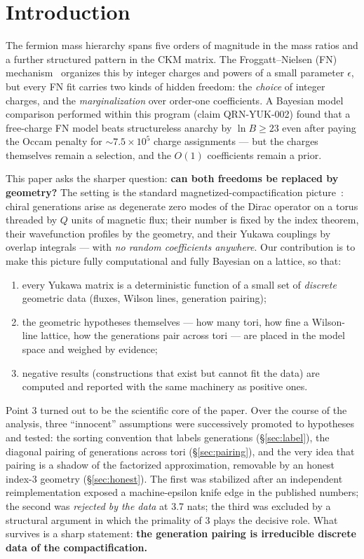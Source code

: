 \documentclass[aps,prd,preprint,nofootinbib]{revtex4-2}
\begin{document}
\section{Introduction}

The fermion mass hierarchy spans five orders of magnitude in the mass ratios
and a further structured pattern in the CKM matrix. The Froggatt--Nielsen (FN)
mechanism~\cite{FN} organizes this by integer charges and powers of a small
parameter $\epsilon$, but every FN fit carries two kinds of hidden freedom: the
\emph{choice} of integer charges, and the \emph{marginalization} over order-one
coefficients. A Bayesian model comparison performed within this program (claim
QRN-YUK-002) found that a free-charge FN model beats structureless anarchy by
$\ln B\ge 23$ even after paying the Occam penalty for $\sim 7.5\times 10^5$
charge assignments --- but the charges themselves remain a selection, and the
$O(1)$ coefficients remain a prior.

This paper asks the sharper question: \textbf{can both freedoms be replaced by
geometry?} The setting is the standard magnetized-compactification
picture~\cite{Bachas,Cremades}: chiral generations arise as degenerate zero
modes of the Dirac operator on a torus threaded by $Q$ units of magnetic flux;
their number is fixed by the index theorem, their wavefunction profiles by the
geometry, and their Yukawa couplings by overlap integrals --- with \emph{no
random coefficients anywhere}. Our contribution is to make this picture fully
computational and fully Bayesian on a lattice, so that:
\begin{enumerate}
\item every Yukawa matrix is a deterministic function of a small set of
      \emph{discrete} geometric data (fluxes, Wilson lines, generation
      pairing);
\item the geometric hypotheses themselves --- how many tori, how fine a
      Wilson-line lattice, how the generations pair across tori --- are placed
      in the model space and weighed by evidence;
\item negative results (constructions that exist but cannot fit the data) are
      computed and reported with the same machinery as positive ones.
\end{enumerate}

Point 3 turned out to be the scientific core of the paper. Over the course of
the analysis, three ``innocent'' assumptions were successively promoted to
hypotheses and tested: the sorting convention that labels generations
(\S\ref{sec:label}), the diagonal pairing of generations across tori
(\S\ref{sec:pairing}), and the very idea that pairing is a shadow of the
factorized approximation, removable by an honest index-3 geometry
(\S\ref{sec:honest}). The first was stabilized after an independent
reimplementation exposed a machine-epsilon knife edge in the published numbers;
the second was \emph{rejected by the data} at 3.7 nats; the third was excluded
by a structural argument in which the primality of 3 plays the decisive role.
What survives is a sharp statement: \textbf{the generation pairing is
irreducible discrete data of the compactification.}
\end{document}
